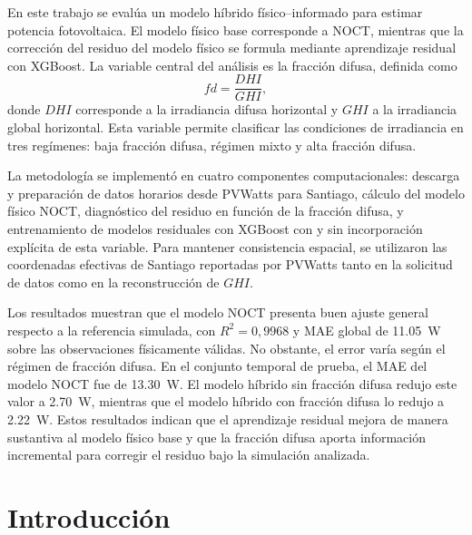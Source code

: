 \documentclass[12pt, letterpaper]{article}
\begin{document}
En este trabajo se eval\'ua un modelo h\'ibrido f\'isico--informado para estimar potencia fotovoltaica. El modelo f\'isico base corresponde a NOCT, mientras que la correcci\'on del residuo del modelo f\'isico se formula mediante aprendizaje residual con XGBoost. La variable central del an\'alisis es la fracci\'on difusa, definida como
\[
    fd = \frac{DHI}{GHI},
\]
donde \(DHI\) corresponde a la irradiancia difusa horizontal y \(GHI\) a la irradiancia global horizontal. Esta variable permite clasificar las condiciones de irradiancia en tres reg\'imenes: baja fracci\'on difusa, r\'egimen mixto y alta fracci\'on difusa.

La metodolog\'ia se implement\'o en cuatro componentes computacionales: descarga y preparaci\'on de datos horarios desde PVWatts para Santiago, c\'alculo del modelo f\'isico NOCT, diagn\'ostico del residuo en funci\'on de la fracci\'on difusa, y entrenamiento de modelos residuales con XGBoost con y sin incorporaci\'on expl\'icita de esta variable. Para mantener consistencia espacial, se utilizaron las coordenadas efectivas de Santiago reportadas por PVWatts tanto en la solicitud de datos como en la reconstrucci\'on de \(GHI\).

Los resultados muestran que el modelo NOCT presenta buen ajuste general respecto a la referencia simulada, con \(R^2 = 0{,}9968\) y MAE global de \SI{11.05}{\watt} sobre las observaciones físicamente válidas. No obstante, el error varía según el régimen de fracción difusa. En el conjunto temporal de prueba, el MAE del modelo NOCT fue de \SI{13.30}{\watt}. El modelo híbrido sin fracción difusa redujo este valor a \SI{2.70}{\watt}, mientras que el modelo híbrido con fracción difusa lo redujo a \SI{2.22}{\watt}. Estos resultados indican que el aprendizaje residual mejora de manera sustantiva al modelo físico base y que la fracción difusa aporta información incremental para corregir el residuo bajo la simulación analizada.

\newpage


\section{Introducci\'on}
\end{document}
